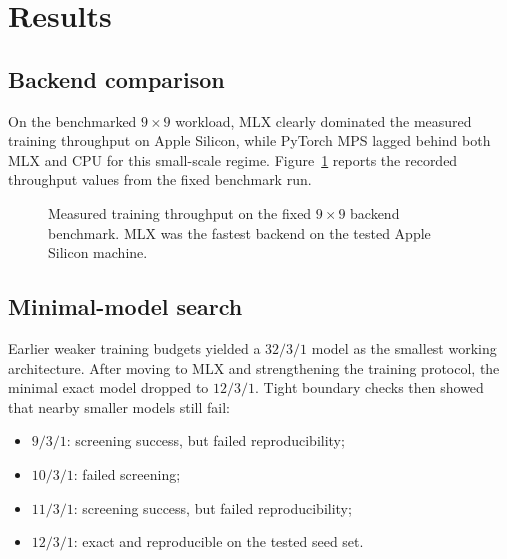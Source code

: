 \documentclass[11pt]{article}
\begin{document}
\section{Results}
\subsection{Backend comparison}
On the benchmarked \(9\times 9\) workload, MLX clearly dominated the measured training throughput on Apple Silicon, while PyTorch MPS lagged behind both MLX and CPU for this small-scale regime. Figure~\ref{fig:backend} reports the recorded throughput values from the fixed benchmark run.

\begin{figure}[t]
\centering
{}
\caption{Measured training throughput on the fixed \(9\times 9\) backend benchmark. MLX was the fastest backend on the tested Apple Silicon machine.}
\label{fig:backend}
\end{figure}

\subsection{Minimal-model search}
Earlier weaker training budgets yielded a \(32/3/1\) model as the smallest working architecture. After moving to MLX and strengthening the training protocol, the minimal exact model dropped to \(12/3/1\). Tight boundary checks then showed that nearby smaller models still fail:
\begin{itemize}
  \item \(9/3/1\): screening success, but failed reproducibility;
  \item \(10/3/1\): failed screening;
  \item \(11/3/1\): screening success, but failed reproducibility;
  \item \(12/3/1\): exact and reproducible on the tested seed set.
\end{itemize}
\end{document}
